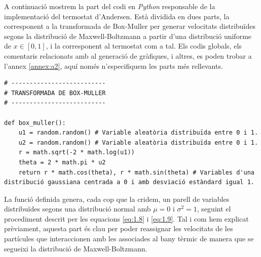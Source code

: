 \documentclass[a4paper,10.5pt]{report}
\begin{document}
A continuació mostrem la part del codi en \textit{Python} responsable de la implementació del termostat d'Andersen. Està dividida en dues parts, la corresponent a la transformada de Box-Muller per generar velocitats distribuïdes segons la distribució de Maxwell-Boltzmann a partir d'una distribució uniforme de $x \in [0,1]$, i la corresponent al termostat com a tal. Els codis globals, els comentaris relacionats amb al generació de gràfiques, i altres, es poden trobar a l'annex \ref{annex:a2}, aquí només n'especifiquem les parts més rellevants.

\begin{lstlisting}[caption={Transformada de Box-Muller.}]
# --------------------------
# TRANSFORMADA DE BOX-MULLER
# --------------------------
	
def box_muller():
	u1 = random.random() # Variable aleatòria distribuïda entre 0 i 1.
	u2 = random.random() # Variable aleatòria distribuïda entre 0 i 1.
	r = math.sqrt(-2 * math.log(u1))
	theta = 2 * math.pi * u2
	return r * math.cos(theta), r * math.sin(theta) # Variables d'una distribució gaussiana centrada a 0 i amb desviació estàndard igual 1.	
\end{lstlisting}

La funció definida genera, cada cop que la cridem, un parell de variables distribuïdes segons una distribució normal amb $\mu = 0$ i $\sigma^2 = 1$, seguint el procediment descrit per les equacions \eqref{eq:1.8} i \eqref{eq:1.9}. Tal i com hem explicat prèviament, aquesta part és clau per poder reassignar les velocitats de les partícules que interaccionen amb les associades al bany tèrmic de manera que se segueixi la distribució de Maxwell-Boltzmann.
\end{document}
